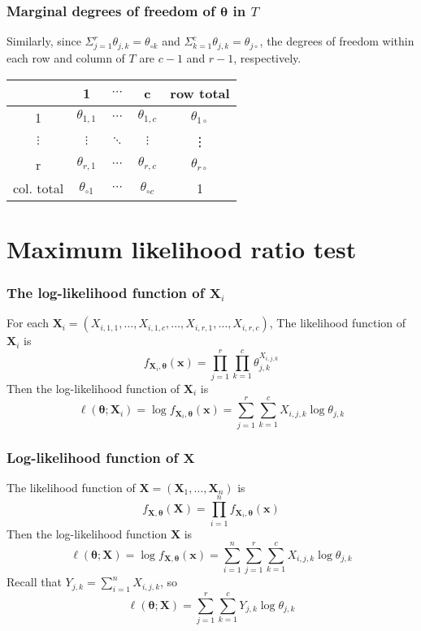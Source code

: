 \documentclass{beamer}
\begin{document}
\begin{frame}
	\frametitle{Marginal degrees of freedom of $\boldsymbol{\theta}$ in $T$}
	Similarly, since $\Sigma_{j=1}^r\theta_{j,k} = \theta_{\circ k}$ and $\Sigma_{k=1}^c\theta_{j,k} = \theta_{j\circ}$, the degrees of freedom within each row and column of $T$ are $c-1$ and $r-1$, respectively.
	\begin{center}
		\begin{tabular}{ |c|c|c|c|c| } 
			\hline
			&1 & $\cdots$ & c&row total \\ 
			\hline
			1&$\theta_{1,1}$ &$\cdots$ & $\theta_{1,c}$&$\theta_{1\circ}$ \\ 
			\hline
			$\vdots$& $\vdots$& $\ddots$ & $\vdots$&\vdots \\ 
			\hline
			r&$\theta_{r,1}$ & $\cdots$ & $\theta_{r,c}$&$\theta_{r\circ}$ \\ 
			\hline
			col. total&$\theta_{\circ1}$ & $\cdots$ & $\theta_{\circ c}$&1 \\ 
			\hline
		\end{tabular}
	\end{center}
	
\end{frame}

\section{Maximum likelihood ratio test}
\begin{frame}
\frametitle{The log-likelihood function of $\textbf{X}_i$}

For each $\textbf{X}_i = (X_{i,1,1}, \ldots, X_{i,1,c}, \ldots, X_{i,r,1}, \ldots, X_{i,r,c})$,
\vskip0.2in
The likelihood function of $\textbf{X}_i$ is
\[f_{\textbf{X}_i, \boldsymbol\theta}(\textbf{x}) = \prod_{j=1}^r\prod_{k=1}^c\theta_{j,k}^{X_{i,j,k}}\]
Then the log-likelihood function of $\textbf{X}_i$ is \[\ell(\boldsymbol{\theta}; \textbf{X}_i) = \log f_{\textbf{X}_i, \boldsymbol\theta}(\textbf{x}) = \sum_{j=1}^r\sum_{k=1}^cX_{i,j,k}\log\theta_{j,k}\]
	
\end{frame}

\begin{frame}
\frametitle{Log-likelihood function of $\textbf{X}$}

The likelihood function of $\textbf{X} = (\textbf{X}_1, \ldots, \textbf{X}_n)$ is\\
\[f_{\textbf{X}, \boldsymbol{\theta}}(\textbf{X}) = \prod_{i=1}^nf_{\textbf{X}_i, \boldsymbol\theta}(\textbf{x})\]
Then the log-likelihood function $\textbf{X}$ is
\[\ell(\boldsymbol{\theta}; \textbf{X}) = \log f_{\textbf{X}, \boldsymbol\theta}(\textbf{x}) = \sum_{i=1}^n\sum_{j=1}^r\sum_{k=1}^cX_{i,j,k}\log\theta_{j,k}\]
Recall that $Y_{j,k} = \sum_{i=1}^nX_{i,j,k}$, so
\[\ell(\boldsymbol{\theta}; \textbf{X}) = \sum_{j=1}^r\sum_{k=1}^cY_{j,k}\log\theta_{j,k}\]
	
\end{frame}
\end{document}
